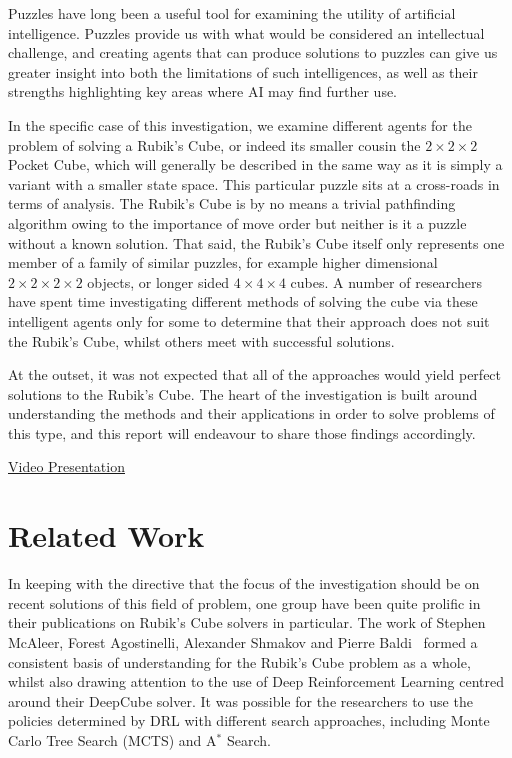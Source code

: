 \documentclass[UKenglish]{libraries/svproc}
\begin{document}
Puzzles have long been a useful tool for examining the utility of artificial intelligence. Puzzles provide us with what would be considered an intellectual challenge, and creating agents that can produce solutions to puzzles can give us greater insight into both the limitations of such intelligences, as well as their strengths highlighting key areas where AI may find further use.

In the specific case of this investigation, we examine different agents for the problem of solving a Rubik's Cube, or indeed its smaller cousin the $2\times 2\times 2$ Pocket Cube, which will generally be described in the same way as it is simply a variant with a smaller state space. This particular puzzle sits at a cross-roads in terms of analysis. The Rubik's Cube is by no means a trivial pathfinding algorithm owing to the importance of move order but neither is it a puzzle without a known solution. That said, the Rubik's Cube itself only represents one member of a family of similar puzzles, for example higher dimensional $2\times 2\times 2\times 2$ objects, or longer sided $4\times 4\times 4$ cubes. A number of researchers have spent time investigating different methods of solving the cube via these intelligent agents only for some to determine that their approach does not suit the Rubik's Cube, whilst others meet with successful solutions.

At the outset, it was not expected that all of the approaches would yield perfect solutions to the Rubik's Cube. The heart of the investigation is built around understanding the methods and their applications in order to solve problems of this type, and this report will endeavour to share those findings accordingly.

\par

\centerline{
\href{https://tcdud-my.sharepoint.com/:v:/g/personal/wosulliv_tcd_ie/EfZp76zjybdOkXOPufEgXxcB1N7eRqVvDfTOixktLc8bgA?e=lQsjbX}{Video Presentation}}

\section{Related Work}
In keeping with the directive that the focus of the investigation should be on recent solutions of this field of problem, one group have been quite prolific in their publications on Rubik's Cube solvers in particular. The work of Stephen McAleer, Forest Agostinelli, Alexander Shmakov and Pierre Baldi~\cite{mcaleer2018solving, mcaleer2019solving, agostinelli2019solving} formed a consistent basis of understanding for the Rubik's Cube problem as a whole, whilst also drawing attention to the use of Deep Reinforcement Learning centred around their DeepCube solver. It was possible for the researchers to use the policies determined by DRL with different search approaches, including Monte Carlo Tree Search (MCTS) and A$^{\ast}$ Search.
\end{document}
